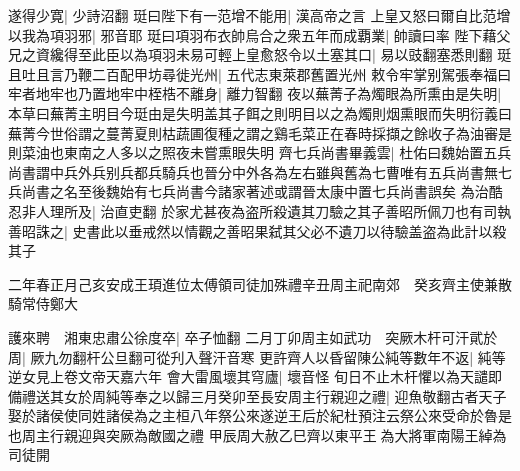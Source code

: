 遂得少寛|{
	少詩沼翻}
珽曰陛下有一范增不能用|{
	漢高帝之言}
上皇又怒曰爾自比范增以我為項羽邪|{
	邪音耶}
珽曰項羽布衣帥烏合之衆五年而成覇業|{
	帥讀曰率}
陛下藉父兄之資纔得至此臣以為項羽未易可輕上皇愈怒令以土塞其口|{
	易以豉翻塞悉則翻}
珽且吐且言乃鞭二百配甲坊尋徙光州|{
	五代志東萊郡舊置光州}
敕令牢掌别駕張奉福曰牢者地牢也乃置地牢中桎梏不離身|{
	離力智翻}
夜以蕪菁子為燭眼為所熏由是失明|{
	本草曰蕪菁主明目今珽由是失明盖其子餌之則明目以之為燭則烟熏眼而失明衍義曰蕪菁今世俗謂之蔓菁夏則枯蔬圃復種之謂之鷄毛菜正在春時採擷之餘收子為油審是則菜油也東南之人多以之照夜未嘗熏眼失明}
齊七兵尚書畢義雲|{
	杜佑曰魏始置五兵尚書謂中兵外兵别兵都兵騎兵也晉分中外各為左右雖與舊為七曹唯有五兵尚書無七兵尚書之名至後魏始有七兵尚書今諸家著述或謂晉太康中置七兵尚書誤矣}
為治酷忍非人理所及|{
	治直吏翻}
於家尤甚夜為盗所殺遺其刀驗之其子善昭所佩刀也有司執善昭誅之|{
	史書此以垂戒然以情觀之善昭果弑其父必不遺刀以待驗盖盗為此計以殺其子}


二年春正月己亥安成王頊進位太傅領司徒加殊禮辛丑周主祀南郊　癸亥齊主使兼散騎常侍鄭大

護來聘　湘東忠肅公徐度卒|{
	卒子恤翻}
二月丁卯周主如武功　突厥木杆可汗貮於周|{
	厥九勿翻杆公旦翻可從刋入聲汗音寒}
更許齊人以昏留陳公純等數年不返|{
	純等逆女見上卷文帝天嘉六年}
會大雷風壞其穹廬|{
	壞音怪}
旬日不止木杆懼以為天譴即備禮送其女於周純等奉之以歸三月癸卯至長安周主行親迎之禮|{
	迎魚敬翻古者天子娶於諸侯使同姓諸侯為之主桓八年祭公來遂逆王后於紀杜預注云祭公來受命於魯是也周主行親迎與突厥為敵國之禮}
甲辰周大赦乙巳齊以東平王為大將軍南陽王綽為司徒開

